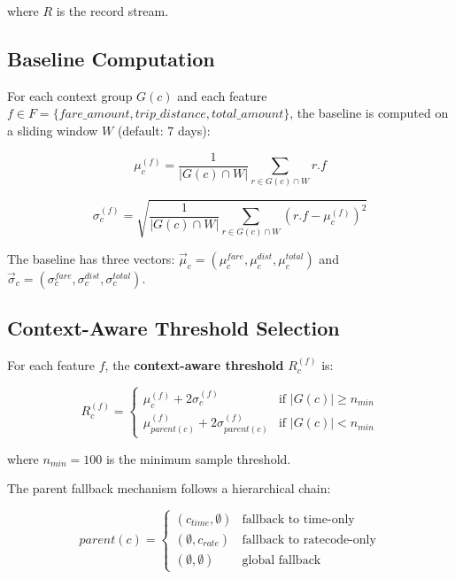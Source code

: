 where $R$ is the record stream.

\subsection{Baseline Computation}

For each context group $G(c)$ and each feature $f \in F = \{fare\_amount, trip\_distance, total\_amount\}$, the baseline is computed on a sliding window $W$ (default: 7 days):

\begin{equation}
\mu_c^{(f)} = \frac{1}{|G(c) \cap W|} \sum_{r \in G(c) \cap W} r.f
\end{equation}

\begin{equation}
\sigma_c^{(f)} = \sqrt{\frac{1}{|G(c) \cap W|} \sum_{r \in G(c) \cap W} (r.f - \mu_c^{(f)})^2}
\end{equation}

The baseline has three vectors: $\vec{\mu}_c = (\mu_c^{fare}, \mu_c^{dist}, \mu_c^{total})$ and $\vec{\sigma}_c = (\sigma_c^{fare}, \sigma_c^{dist}, \sigma_c^{total})$.

\subsection{Context-Aware Threshold Selection}

For each feature $f$, the \textbf{context-aware threshold} $R_c^{(f)}$ is:

\begin{equation}
R_c^{(f)} = 
\begin{cases}
\mu_c^{(f)} + 2 \sigma_c^{(f)} & \text{if } |G(c)| \geq n_{min} \\
\mu_{parent(c)}^{(f)} + 2 \sigma_{parent(c)}^{(f)} & \text{if } |G(c)| < n_{min}
\end{cases}
\end{equation}

where $n_{min} = 100$ is the minimum sample threshold.

The parent fallback mechanism follows a hierarchical chain:

\begin{equation}
parent(c) = 
\begin{cases}
(c_{time}, \emptyset) & \text{fallback to time-only} \\
(\emptyset, c_{rate}) & \text{fallback to ratecode-only} \\
(\emptyset, \emptyset) & \text{global fallback}
\end{cases}
\end{equation}

